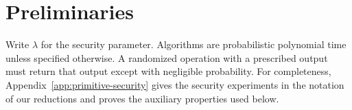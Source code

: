 \section{Preliminaries}
\label{sec:preliminaries}

Write $\lambda$ for the security parameter. Algorithms are probabilistic
polynomial time unless specified otherwise. A randomized operation with
a prescribed output must return that output except with negligible probability.
For completeness, Appendix~\ref{app:primitive-security} gives the security
experiments in the notation of our reductions and proves the auxiliary
properties used below.







